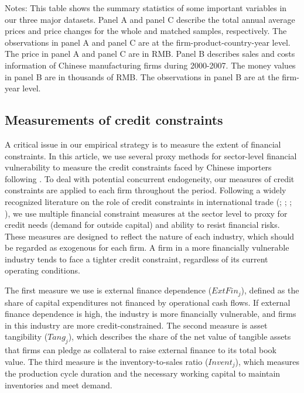 \begin{table}[htbp]
{\begin{threeparttable}
\begin{tabular}{lcccccc}
		\bottomrule
	\end{tabular}
	\begin{tablenotes}
		\footnotesize
		\item[Notes:] This table shows the summary statistics of some important variables in our three major datasets. Panel A and panel C describe the total annual average prices and price changes for the whole and matched samples, respectively. The observations in panel A and panel C are at the firm-product-country-year level. The price in panel A and panel C are in RMB. Panel B describes sales and costs information of Chinese manufacturing firms during 2000-2007. The money values in panel B are in thousands of RMB. The observations in panel B are at the firm-year level.
	\end{tablenotes}
	\end{threeparttable}
        }
\end{table}

\subsection{Measurements of credit constraints} \label{Measurements-Credit Constraints}

A critical issue in our empirical strategy is to measure the extent of financial constraints. In this article, we use several proxy methods for sector-level financial vulnerability to measure the credit constraints faced by Chinese importers following \cite{manova2013}. To deal with potential concurrent endogeneity, our measures of credit constraints are applied to each firm throughout the period. Following a widely recognized literature on the role of credit constraints in international trade (\cite{kroszner2007}; \cite{manova2013}; \cite{manova-wei-zhang2015}; \cite{fan-lai-li2015}), we use multiple financial constraint measures at the sector level to proxy for credit needs (demand for outside capital) and ability to resist financial risks. These measures are designed to reflect the nature of each industry, which should be regarded as exogenous for each firm. A firm in a more financially vulnerable industry tends to face a tighter credit constraint, regardless of its current operating conditions.

The first measure we use is external finance dependence ($ExtFin_j$), defined as the share of capital expenditures not financed by operational cash flows. If external finance dependence is high, the industry is more financially vulnerable, and firms in this industry are more credit-constrained. The second measure is asset tangibility ($Tang_j$), which describes the share of the net value of tangible assets that firms can pledge as collateral to raise external finance to its total book value. The third measure is the inventory-to-sales ratio ($Invent_j$), which measures the production cycle duration and the necessary working capital to maintain inventories and meet demand. 

